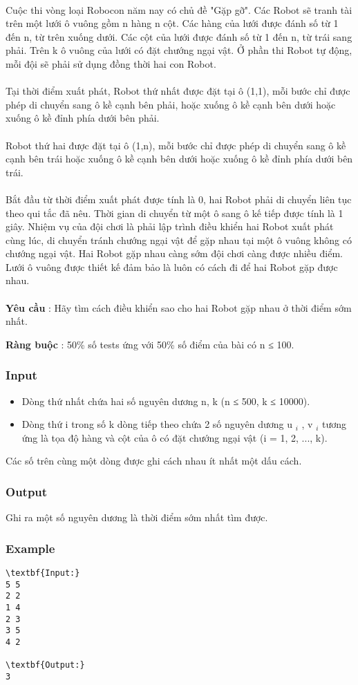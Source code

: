 

 

Cuộc thi vòng loại Robocon năm nay có chủ đề "Gặp gỡ". Các Robot sẽ tranh tài trên một lưới ô vuông gồm n hàng n cột. Các hàng của lưới được đánh số từ 1 đến n, từ trên xuống dưới. Các cột của lưới được đánh số từ 1 đến n, từ trái sang phải. Trên k ô vuông của lưới có đặt chướng ngại vật. Ở phần thi Robot tự động, mỗi đội sẽ phải sử dụng đồng thời hai con Robot.
\\
\\Tại thời điểm xuất phát, Robot thứ nhất được đặt tại ô (1,1), mỗi bước chỉ được phép di chuyển sang ô kề cạnh bên phải, hoặc xuống ô kề cạnh bên dưới hoặc xuống ô kề đỉnh phía dưới bên phải.
\\
\\Robot thứ hai được đặt tại ô (1,n), mỗi bước chỉ được phép di chuyển sang ô kề cạnh bên trái hoặc xuống ô kề cạnh bên dưới hoặc xuống ô kề đỉnh phía dưới bên trái.
\\
\\Bắt đầu từ thời điểm xuất phát được tính là 0, hai Robot phải di chuyển liên tục theo qui tắc đã nêu. Thời gian di chuyển từ một ô sang ô kế tiếp được tính là 1 giây. Nhiệm vụ của đội chơi là phải lập trình điều khiển hai Robot xuất phát cùng lúc, di chuyển tránh chướng ngại vật để gặp nhau tại một ô vuông không có chướng ngại vật. Hai Robot gặp nhau càng sớm đội chơi càng được nhiều điểm. Lưới ô vuông được thiết kế đảm bảo là luôn có cách đi để hai Robot gặp được nhau.
\\
\\\textbf{Yêu cầu } : Hãy tìm cách điều khiển sao cho hai Robot gặp nhau ở thời điểm sớm nhất.

\textbf{Ràng buộc } : 50\% số tests ứng với 50\% số điểm của bài có n ≤ 100.

\subsubsection{Input}
\begin{itemize}
	\item Dòng thứ nhất chứa hai số nguyên dương n, k (n ≤ 500, k ≤ 10000).
	\item Dòng thứ i trong số k dòng tiếp theo chứa 2 số nguyên dương u $_ i $ , v $_ i $ tương ứng là tọa độ hàng và cột của ô có đặt chướng ngại vật (i = 1, 2, ..., k).
\end{itemize}

Các số trên cùng một dòng được ghi cách nhau ít nhất một dấu cách.

\subsubsection{Output}

Ghi ra một số nguyên dương là thời điểm sớm nhất tìm được.

\subsubsection{Example}
\begin{verbatim}
\textbf{Input:}
5 5
2 2
1 4
2 3
3 5
4 2

\textbf{Output:}
3
\end{verbatim}